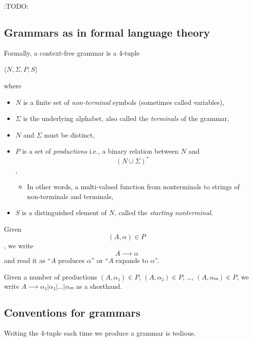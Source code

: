 \documentclass[11pt]{article}
\theoremstyle{definition}
\begin{document}
:TODO:

\subsection{Grammars as in formal language theory}
\label{sec:orgc7073da}

Formally, a context-free grammar is a 4-tuple
\begin{center}
\(⟨N, Σ, P, S⟩\)
\end{center}
where
\begin{itemize}
\item \(N\) is a finite set of \emph{non-terminal} symbols
(sometimes called variables),
\item \(Σ\) is the underlying alphabet,
also called the \emph{terminals} of the grammar,
\item \(N\) and \(Σ\) must be distinct,
\item \(P\) is a set of \emph{productions} i.e.,
a binary relation between \(N\) and \[ (N ∪ Σ)^{*} \],
\begin{itemize}
\item In other words, a multi-valued function from
nonterminals to strings of non-terminals and terminals,
\end{itemize}
\item \(S\) is a distinguished element of \(N\), called the \emph{starting nonterminal}.
\end{itemize}

Given \[ (A, α) ∈ P \], we write \[ A ⟶ α \] and read it as
“\(A\) produces \(α\)” or “\(A\) expands to \(α\)”.

Given a number of
productions \((A, α₁) ∈ P\), \((A, α₂) ∈ P\), …, \((A, αₘ) ∈ P\), 
we write \(A ⟶ α₁ | α₂ | … | αₘ\) as a shorthand.

\subsection{Conventions for grammars}
\label{sec:org47614c1}

Writing the 4-tuple each time we produce a grammar is tedious.
\end{document}
